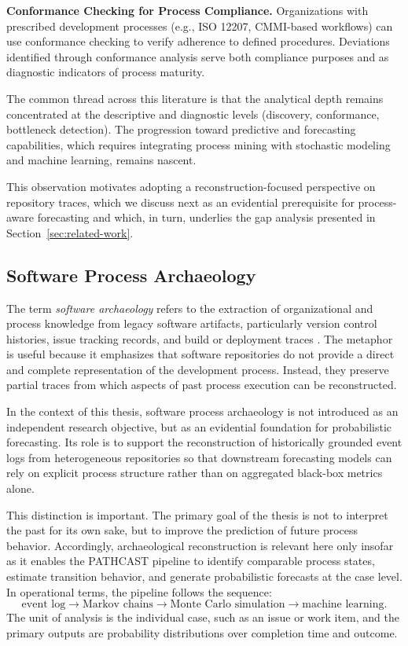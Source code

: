 \textbf{Conformance Checking for Process Compliance.} Organizations
with prescribed development processes (e.g., ISO 12207, CMMI-based
workflows) can use conformance checking to verify adherence to defined
procedures. Deviations identified through conformance analysis serve both
compliance purposes and as diagnostic indicators of process maturity.

The common thread across this literature is that the analytical depth
remains concentrated at the descriptive and diagnostic levels (discovery,
conformance, bottleneck detection). The progression toward predictive and
forecasting capabilities, which requires integrating process mining with
stochastic modeling and machine learning, remains nascent. 

This observation motivates adopting a reconstruction-focused perspective on repository traces, which we discuss next as an evidential prerequisite for process-aware forecasting and which, in turn, underlies the gap analysis presented in Section~\ref{sec:related-work}.


\subsection{Software Process Archaeology}

The term \emph{software archaeology} refers to the extraction of organizational and process knowledge from legacy software artifacts, particularly version control histories, issue tracking records, and build or deployment traces \cite{Zimmermann2005MiningVersionHistories}. The metaphor is useful because it emphasizes that software repositories do not provide a direct and complete representation of the development process. Instead, they preserve partial traces from which aspects of past process execution can be reconstructed.

In the context of this thesis, software process archaeology is not introduced as an independent research objective, but as an evidential foundation for probabilistic forecasting. Its role is to support the reconstruction of historically grounded event logs from heterogeneous repositories so that downstream forecasting models can rely on explicit process structure rather than on aggregated black-box metrics alone.

This distinction is important. The primary goal of the thesis is not to interpret the past for its own sake, but to improve the prediction of future process behavior. Accordingly, archaeological reconstruction is relevant here only insofar as it enables the PATHCAST pipeline to identify comparable process states, estimate transition behavior, and generate probabilistic forecasts at the case level. In operational terms, the pipeline follows the sequence:
\[
\text{event log} \rightarrow \text{Markov chains} \rightarrow \text{Monte Carlo simulation} \rightarrow \text{machine learning}.
\]
The unit of analysis is the individual case, such as an issue or work item, and the primary outputs are probability distributions over completion time and outcome.

